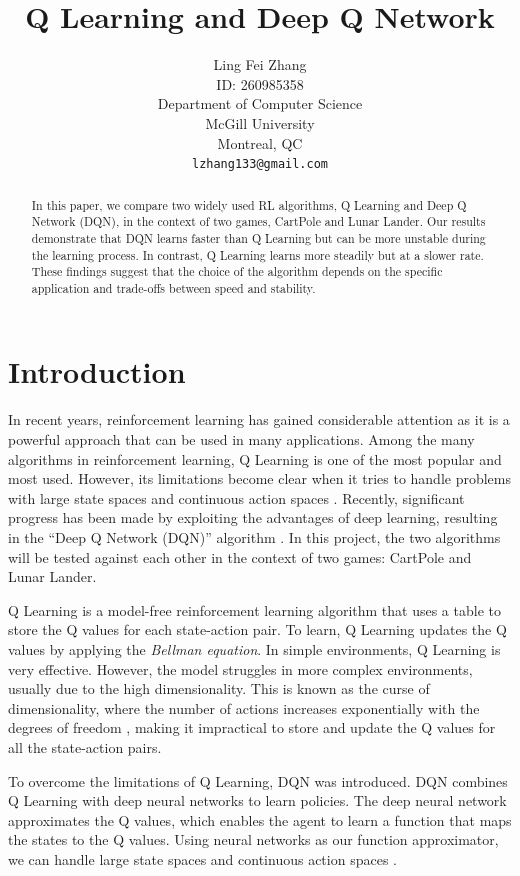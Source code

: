 \documentclass{article}
\title{Q Learning and Deep Q Network}
\author{%
      Ling Fei Zhang\\
      ID: 260985358\\
      Department of Computer Science\\ McGill University\\ Montreal, QC \\
      \texttt{lzhang133@gmail.com} \\
}
\begin{document}
\maketitle

\begin{abstract}
      In this paper, we compare two widely used RL algorithms, Q Learning and Deep Q Network (DQN), in the context of two games, CartPole and Lunar Lander. Our results demonstrate that DQN learns faster than Q Learning but can be more unstable during the learning process. In contrast, Q Learning learns more steadily but at a slower rate. These findings suggest that the choice of the algorithm depends on the specific application and trade-offs between speed and stability.
\end{abstract}

\section{Introduction}

In recent years, reinforcement learning has gained considerable attention as it
is a powerful approach that can be used in many applications. Among the many
algorithms in reinforcement learning, Q Learning is one of the most popular and
most used. However, its limitations become clear when it tries to handle
problems with large state spaces and continuous action spaces \cite{qlearning}.
Recently, significant progress has been made by exploiting the advantages of
deep learning, resulting in the ``Deep Q Network (DQN)'' algorithm
\cite{DBLP:journals/corr/MnihKSGAWR13}. In this project, the two algorithms
will be tested against each other in the context of two games: CartPole and
Lunar Lander.

Q Learning is a model-free reinforcement learning algorithm that uses a table
to store the Q values for each state-action pair. To learn, Q Learning updates
the Q values by applying the \emph{Bellman equation}. In simple environments, Q
Learning is very effective. However, the model struggles in more complex
environments, usually due to the high dimensionality. This is known as the
curse of dimensionality, where the number of actions increases exponentially
with the degrees of freedom \cite{soft_update}, making it impractical to store
and update the Q values for all the state-action pairs.

To overcome the limitations of Q Learning, DQN was introduced. DQN combines Q
Learning with deep neural networks to learn policies. The deep neural network
approximates the Q values, which enables the agent to learn a function that
maps the states to the Q values. Using neural networks as our function
approximator, we can handle large state spaces and continuous action spaces
\cite{function_approximation,temporal_diff}.
\end{document}
